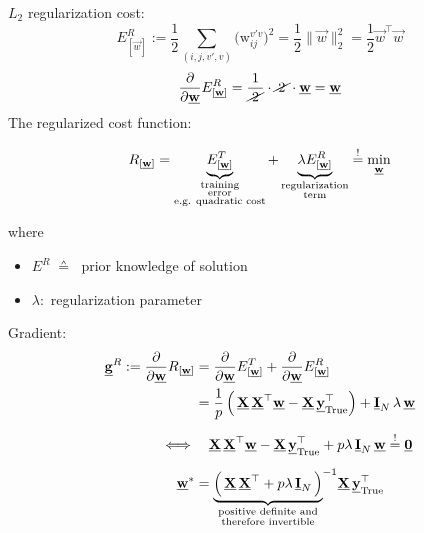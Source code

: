 \begin{frame}

$L_2$ regularization cost:
\begin{equation}
E^R_{[\vec w]} := \frac{1}{2} \sum_{(i, j, v', v)} 
			\big( \mathrm{w}_{ij}^{v'v} \big)^2 = \frac{1}{2} \lVert \vec w \rVert_2^2 = \frac{1}{2} \vec w^\top \vec w 
\end{equation}
\renewcommand{\CancelColor}{\color{gray}}
\begin{equation}
\frac{\partial}{\partial \underline{\mathbf{w}}} E^R_{[\underline{\mathbf{w}}]} = \frac{1}{\cancel{\;2\;}} \cdot \cancel{\;2\;} \cdot \underline{\mathbf{w}} = \underline{\mathbf{w}}
\end{equation}
\pause
The regularized cost function:

\begin{equation}
	R_{[\underline{\mathbf{w}}]} = \underbrace{ E_{[\underline{\mathbf{w}}]}^T }_{
			\substack{\text{training} \\ \text{error} \\ \text{e.g. quadratic cost}}}
		+ \underbrace{ \lambda E_{[\underline{\mathbf{w}}]}^R }_{
			\substack{\text{regularization} \\ \text{term}}}
		\stackrel{\mathrm{!}}{=} \min_{\underline{\mathbf{w}}}
\end{equation}

where 
\begin{itemize}
	\item $E^R \; \corresponds \; $ prior knowledge of solution
	\item $\lambda:$ regularization parameter 
\end{itemize}
\end{frame}
\begin{frame}
Gradient:
\pause
\begin{align}
\underline{\mathbf{g}}^R :=  \frac{\partial}{\partial \underline{\mathbf{w}}} R_{[\underline{\mathbf{w}}]}
&= \frac{\partial}{\partial \underline{\mathbf{w}}} E^T_{[\underline{\mathbf{w}}]} + \frac{\partial}{\partial \underline{\mathbf{w}}} E^R_{[\underline{\mathbf{w}}]}\\
&= \frac{1}{p} \left(\, \underline{\mathbf{X}} \, \underline{\mathbf{X}}^\top \underline{\mathbf{w}} - \underline{\mathbf{X}}\, \underline{\mathbf{y}}_{\text{True}}^\top \right) + \underline{\mathbf{I}}_N \, \lambda \, \underline{\mathbf{w}}\\[2mm]
\iff& \quad \underline{\mathbf{X}} \, \underline{\mathbf{X}}^\top \underline{\mathbf{w}} - \underline{\mathbf{X}}\, \underline{\mathbf{y}}_{\text{True}}^\top + p \lambda \, \underline{\mathbf{I}}_N \,  \underline{\mathbf{w}} \stackrel{\mathrm{!}}{=} \underline{\mathbf{0}}\\[2mm]
\underline{\mathbf{w}}^* &=  {\underbrace{
\left(\, \underline{\mathbf{X}} \, \underline{\mathbf{X}}^\top + p \lambda \, \underline{\mathbf{I}}_N \,  \right)
}_{
\substack{
\text{positive definite and}\\
\text{therefore invertible}\\
}
}
}^{-1} \underline{\mathbf{X}} \, \underline{\mathbf{y}}_{\mathrm{True}}^{\top}
\end{align}

\end{frame}
